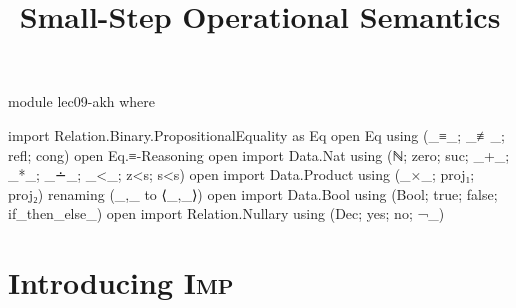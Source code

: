 \documentclass{lecturenotes}
\title{Small-Step Operational Semantics}
\newcommand{\Imp}{\textsc{Imp}\xspace}
\begin{document}
\maketitle

\begin{code}[hide]
module lec09-akh where

import Relation.Binary.PropositionalEquality as Eq
open Eq using (_≡_; _≢_; refl; cong)
open Eq.≡-Reasoning
open import Data.Nat using (ℕ; zero; suc; _+_; _*_; _∸_; _<_; z<s; s<s)
open import Data.Product using (_×_; proj₁; proj₂) renaming (_,_ to ⟨_,_⟩)
open import Data.Bool using (Bool; true; false; if_then_else_)
open import Relation.Nullary using (Dec; yes; no; ¬_)
\end{code}

\section{Introducing \Imp}
\label{sec:intr-imp}
\end{document}
